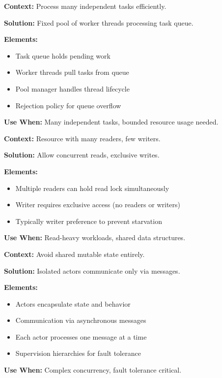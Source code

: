 \documentclass[11pt,letterpaper]{article}
\begin{document}
\begin{patternbox}
\textbf{Context:} Process many independent tasks efficiently.

\textbf{Solution:} Fixed pool of worker threads processing task queue.

\textbf{Elements:}
\begin{itemize}[nosep]
    \item Task queue holds pending work
    \item Worker threads pull tasks from queue
    \item Pool manager handles thread lifecycle
    \item Rejection policy for queue overflow
\end{itemize}

\textbf{Use When:} Many independent tasks, bounded resource usage needed.
\end{patternbox}

\begin{patternbox}
\textbf{Context:} Resource with many readers, few writers.

\textbf{Solution:} Allow concurrent reads, exclusive writes.

\textbf{Elements:}
\begin{itemize}[nosep]
    \item Multiple readers can hold read lock simultaneously
    \item Writer requires exclusive access (no readers or writers)
    \item Typically writer preference to prevent starvation
\end{itemize}

\textbf{Use When:} Read-heavy workloads, shared data structures.
\end{patternbox}

\begin{patternbox}
\textbf{Context:} Avoid shared mutable state entirely.

\textbf{Solution:} Isolated actors communicate only via messages.

\textbf{Elements:}
\begin{itemize}[nosep]
    \item Actors encapsulate state and behavior
    \item Communication via asynchronous messages
    \item Each actor processes one message at a time
    \item Supervision hierarchies for fault tolerance
\end{itemize}

\textbf{Use When:} Complex concurrency, fault tolerance critical.
\end{patternbox}
\end{document}
